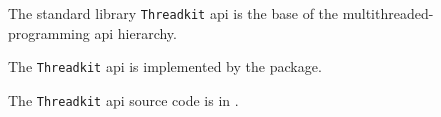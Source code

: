 
The standard library {\tt Threadkit} api is the base of the multithreaded-programming api hierarchy.

The {\tt Threadkit} api is implemented by the  package.

The {\tt Threadkit} api source code is in .
